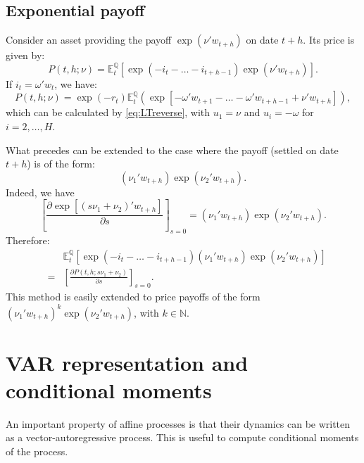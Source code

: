 \documentclass[
  12pt,
]{book}
\theoremstyle{definition}
\theoremstyle{definition}
\theoremstyle{definition}
\theoremstyle{definition}
\theoremstyle{remark}
\begin{document}
\hypertarget{ExponentialPayoff}{%
\subsection{Exponential payoff}\label{ExponentialPayoff}}

Consider an asset providing the payoff \(\exp(\nu' w_{t+h})\) on date \(t+h\). Its price is given by:
\[
P(t,h;\nu) = \mathbb{E}^{\mathbb{Q}}_t[\exp(-i_{t}-\dots-i_{t+h-1}) \exp(\nu' w_{t+h})].
\]
If \(i_t = \omega'w_t\), we have:
\[
P(t,h;\nu) = \exp(-r_{t})\mathbb{E}^{\mathbb{Q}}_t \left(\exp[-\omega' w_{t+1}-\dots-\omega' w_{t+h-1}+ \nu' w_{t+h}]\right),
\]
which can be calculated by \eqref{eq:LTreverse}, with \(u_1 = \nu\) and \(u_i = -\omega\) for \(i = 2,\dots,H\).

What precedes can be extended to the case where the payoff (settled on date \(t+h\)) is of the form:
\[
(\nu_1'w_{t+h}) \exp(\nu_2' w_{t+h}).
\]
Indeed, we have
\[
\left[\frac{\partial \exp[(s \nu_1+ \nu_2)'w_{t+h}]}{\partial s}\right]_{s=0} = (\nu_1'w_{t+h}) \exp(\nu_2' w_{t+h}).
\]
Therefore:
\begin{eqnarray}
&&\mathbb{E}_t^{\mathbb{Q}}[\exp(-i_t - \dots - i_{t+h-1})(\nu_1'w_{t+h}) \exp(\nu_2' w_{t+h})] \nonumber\\
&=& \left[
\frac{\partial P(t,h;s \nu_1 + \nu_2)}{\partial s}
\right]_{s=0}.\label{eq:Affineexppayoff}
\end{eqnarray}
This method is easily extended to price payoffs of the form \((\nu_1'w_{t+h})^k \exp(\nu_2' w_{t+h})\), with \(k \in \mathbb{N}\).

\hypertarget{var-representation-and-conditional-moments}{%
\section{VAR representation and conditional moments}\label{var-representation-and-conditional-moments}}

An important property of affine processes is that their dynamics can be written as a vector-autoregressive process. This is useful to compute conditional moments of the process.
\end{document}
